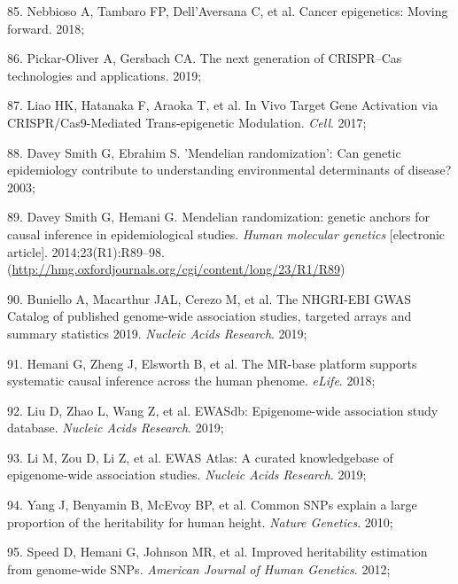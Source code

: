 \documentclass[11pt,oneside]{bristolthesis}
\newenvironment{cslreferences}%
  {}%
  {\par}
\begin{document}
\begin{cslreferences}
\leavevmode\hypertarget{ref-Nebbioso2018}{}%
85. Nebbioso A, Tambaro FP, Dell'Aversana C, et al. Cancer epigenetics: Moving forward. 2018;

\leavevmode\hypertarget{ref-Pickar-Oliver2019}{}%
86. Pickar-Oliver A, Gersbach CA. The next generation of CRISPR--Cas technologies and applications. 2019;

\leavevmode\hypertarget{ref-Liao2017}{}%
87. Liao HK, Hatanaka F, Araoka T, et al. In Vivo Target Gene Activation via CRISPR/Cas9-Mediated Trans-epigenetic Modulation. \emph{Cell}. 2017;

\leavevmode\hypertarget{ref-DaveySmith2003}{}%
88. Davey Smith G, Ebrahim S. 'Mendelian randomization': Can genetic epidemiology contribute to understanding environmental determinants of disease? 2003;

\leavevmode\hypertarget{ref-DaveySmith2014}{}%
89. Davey Smith G, Hemani G. Mendelian randomization: genetic anchors for causal inference in epidemiological studies. \emph{Human molecular genetics} {[}electronic article{]}. 2014;23(R1):R89--98. (\url{http://hmg.oxfordjournals.org/cgi/content/long/23/R1/R89})

\leavevmode\hypertarget{ref-Buniello2019}{}%
90. Buniello A, Macarthur JAL, Cerezo M, et al. The NHGRI-EBI GWAS Catalog of published genome-wide association studies, targeted arrays and summary statistics 2019. \emph{Nucleic Acids Research}. 2019;

\leavevmode\hypertarget{ref-Hemani2018}{}%
91. Hemani G, Zheng J, Elsworth B, et al. The MR-base platform supports systematic causal inference across the human phenome. \emph{eLife}. 2018;

\leavevmode\hypertarget{ref-Liu2019}{}%
92. Liu D, Zhao L, Wang Z, et al. EWASdb: Epigenome-wide association study database. \emph{Nucleic Acids Research}. 2019;

\leavevmode\hypertarget{ref-Li2019}{}%
93. Li M, Zou D, Li Z, et al. EWAS Atlas: A curated knowledgebase of epigenome-wide association studies. \emph{Nucleic Acids Research}. 2019;

\leavevmode\hypertarget{ref-Yang2010}{}%
94. Yang J, Benyamin B, McEvoy BP, et al. Common SNPs explain a large proportion of the heritability for human height. \emph{Nature Genetics}. 2010;

\leavevmode\hypertarget{ref-Speed2012}{}%
95. Speed D, Hemani G, Johnson MR, et al. Improved heritability estimation from genome-wide SNPs. \emph{American Journal of Human Genetics}. 2012;


\end{cslreferences}
\end{document}
